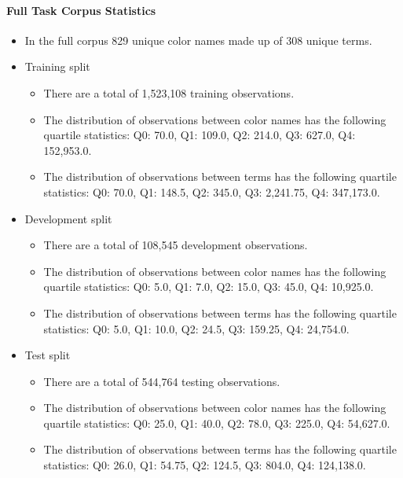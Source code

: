 \paragraph{Full Task Corpus Statistics} \label{sec:fulltaskcorpusstats}
\begin{itemize}
	\item In the full corpus 829 unique color names made up of 308 unique terms. 
	
	\item Training split
	\begin{itemize}
		\item There are a total of 1,523,108 training observations.
		\item The distribution of observations between color names has the following quartile statistics: Q0: 70.0, Q1: 109.0, Q2: 214.0, Q3: 627.0, Q4: 152,953.0.
		\item The distribution of observations between terms has the following quartile statistics: Q0: 70.0, Q1: 148.5, Q2: 345.0, Q3: 2,241.75, Q4: 347,173.0.
	\end{itemize}

	\item Development split
	\begin{itemize}
		\item There are a total of 108,545 development observations.
		\item The distribution of observations between color names has the following quartile statistics:  Q0: 5.0, Q1: 7.0, Q2: 15.0, Q3: 45.0, Q4: 10,925.0.
		\item The distribution of observations between terms has the following quartile statistics: Q0: 5.0, Q1: 10.0, Q2: 24.5, Q3: 159.25, Q4: 24,754.0.
	\end{itemize}
	
	\item Test split
	\begin{itemize}
		\item There are a total of 544,764 testing observations.
		\item The distribution of observations between color names has the following quartile statistics:  Q0: 25.0, Q1: 40.0, Q2: 78.0, Q3: 225.0, Q4: 54,627.0.
		\item The distribution of observations between terms has the following quartile statistics: Q0: 26.0, Q1: 54.75, Q2: 124.5, Q3: 804.0, Q4: 124,138.0.
	\end{itemize}
\end{itemize}	


